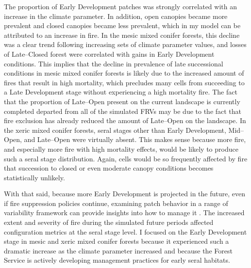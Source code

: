 The proportion of Early Development patches was strongly correlated with an increase in the climate parameter. In addition, open canopies became more prevalent and closed canopies became less prevalent, which in my model can be attributed to an increase in fire. In the mesic mixed conifer forests, this decline was a clear trend following increasing sets of climate parameter values, and losses of Late--Closed forest were correlated with gains in Early Development conditions. This implies that the decline in prevalence of late successional conditions in mesic mixed conifer forests is likely due to the increased amount of fires that result in high mortality, which precludes many cells from succeeding to a Late Development stage without experiencing a high mortality fire. The fact that the proportion of Late--Open present on the current landscape is currently completed departed from all of the simulated FRVs may be due to the fact that fire exclusion has already reduced the amount of Late--Open on the landscape. In the xeric mixed conifer forests, seral stages other than Early Development, Mid--Open, and Late--Open were virtually absent. This makes sense because more fire, and especially more fire with high mortality effects, would be likely to produce such a seral stage distribution. Again, cells would be so frequently affected by fire that succession to closed or even moderate canopy conditions becomes statistically unlikely.

With that said, because more Early Development is projected in the future, even if fire suppression policies continue, examining patch behavior in a range of variability framework can provide insights into how to manage it \citep{McGarigal2005a,McGarigal2005}. The increased extent and severity of fire during the simulated future periods affected configuration metrics at the seral stage level. I focused on the Early Development stage in mesic and xeric mixed conifer forests because it experienced such a dramatic increase as the climate parameter increased and because the Forest Service is actively developing management practices for early seral habitats. 

